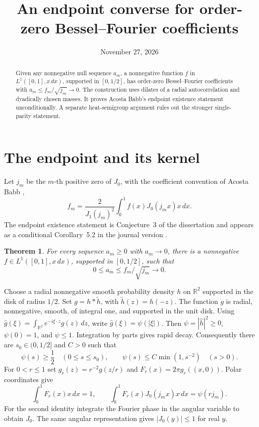 \documentclass[11pt]{amsart}
\title{An endpoint converse for order-zero Bessel--Fourier coefficients}
\date{November 27, 2026}
\newtheorem{theorem}{Theorem}
\begin{document}
\begin{abstract}
Given any nonnegative null sequence \(a_m\), a nonnegative
function \(f\) in \(L^1([0,1],x\,dx)\), supported in
\([0,1/2]\), has order-zero Bessel--Fourier coefficients
with \(a_m\le f_m/\sqrt{j_m}\to0\). The construction uses
dilates of a radial autocorrelation and dyadically chosen
masses. It proves Acosta Babb's endpoint existence statement
unconditionally. A separate heat-semigroup argument rules
out the stronger single-parity statement.
\end{abstract}
\maketitle

\section{The endpoint and its kernel}
Let \(j_m\) be the \(m\)-th positive zero of \(J_0\), with
the coefficient convention of Acosta Babb \cite{acosta},
\[
 f_m=\frac{2}{J_1(j_m)^2}\int_0^1 f(x)J_0(j_m x)x\,dx .
\]
The endpoint existence statement is Conjecture~3 of the
dissertation \cite[Sec.~5.5, p.~88]{thesis} and appears as
a conditional Corollary~5.2 in the journal version
\cite[p.~13]{acosta}.

\begin{theorem}
For every sequence \(a_m\ge0\) with \(a_m\to0\), there is a
nonnegative \(f\in L^1([0,1],x\,dx)\), supported in
\([0,1/2]\), such that
\[
                  0\le a_m\le f_m/\sqrt{j_m}\to0 .
\]
\end{theorem}

Choose a radial nonnegative smooth probability density \(h\)
on \(\mathbb R^2\) supported in the disk of radius \(1/2\).
Set \(g=h*\widetilde h\), with \(\widetilde h(z)=h(-z)\).
The function \(g\) is radial, nonnegative, smooth, of integral
one, and supported in the unit disk. Using
\(\widehat g(\xi)=\int_{\mathbb R^2}e^{-i\xi\cdot z}g(z)\,dz\),
write \(\widehat g(\xi)=\psi(|\xi|)\). Then
\(\psi=|\widehat h|^2\ge0\), \(\psi(0)=1\), and \(\psi\le1\).
Integration by parts gives rapid decay. Consequently there
are \(s_0\in(0,1/2]\) and \(C>0\) such that
\[
  \psi(s)\ge\frac12\quad (0\le s\le s_0),\qquad
  \psi(s)\le C\min(1,s^{-2})\quad(s>0).
\]
For \(0<r\le1\) set \(g_r(z)=r^{-2}g(z/r)\) and
\(F_r(x)=2\pi g_r((x,0))\). Polar coordinates give
\[
 \int_0^1 F_r(x)x\,dx=1,\qquad
 \int_0^1 F_r(x)J_0(j_m x)x\,dx=\psi(r j_m).
\]
For the second identity integrate the Fourier phase in the
angular variable to obtain \(J_0\). The same angular
representation gives \(|J_0(y)|\le1\) for real \(y\).
\end{document}
